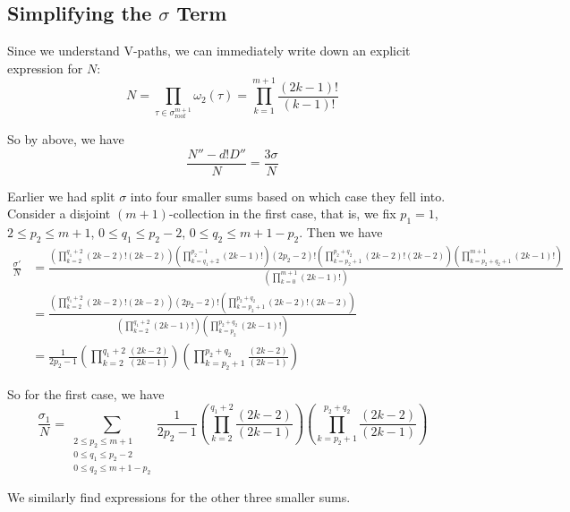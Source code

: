 \documentclass[11pt]{article}
\theoremstyle{mythm}
\begin{document}
\subsection{Simplifying the $\sigma$ Term}

Since we understand V-paths, we can immediately write down an explicit expression for $N$:
\begin{equation*}
N = \prod\limits_{\tau\in\sigma_{\text{roof}}^{m+1}}\omega_2(\tau) = \prod\limits_{k=1}^{m+1}\frac{(2k-1)!}{(k-1)!}
\end{equation*}

So by above, we have
\begin{equation*}
\frac{N''-d!D''}{N} = \frac{3\sigma}{N}
\end{equation*}

Earlier we had split $\sigma$ into four smaller sums based on which case they fell into. Consider a disjoint $(m+1)$-collection in the first case, that is, we fix $p_1 = 1$, $2\leq p_2\leq m+1$, $0\leq q_1\leq p_2 - 2$, $0\leq q_2 \leq m+1-p_2$. Then we have
\begin{align*}
\frac{\sigma'}{N} &= \frac{\left(\prod\limits_{k=2}^{q_1+2}(2k-2)!(2k-2)\right)\left(\prod\limits_{k=q_1+2}^{p_2-1}(2k-1)!\right)(2p_2-2)!\left(\prod\limits_{k=p_2+1}^{p_2+q_2}(2k-2)!(2k-2)\right)\left(\prod\limits_{k=p_2+q_2+1}^{m+1}(2k-1)!\right)}{\left(\prod\limits_{k=0}^{m+1}(2k-1)!\right)} \\
&= \frac{\left(\prod\limits_{k=2}^{q_1+2}(2k-2)!(2k-2)\right)(2p_2-2)!\left(\prod\limits_{k=p_2+1}^{p_2+q_2}(2k-2)!(2k-2)\right)}{\left(\prod\limits_{k=2}^{q_1+2}(2k-1)!\right)\left(\prod\limits_{k=p_2}^{p_2+q_2}(2k-1)!\right)} \\
&= \frac{1}{2p_2-1}\left(\prod\limits_{k=2}^{q_1+2}\frac{(2k-2)}{(2k-1)}\right)\left(\prod\limits_{k=p_2+1}^{p_2+q_2}\frac{(2k-2)}{(2k-1)}\right)
\end{align*}

So for the first case, we have
\begin{equation*}
\frac{\sigma_1}{N} = \sum\limits_{\substack{2\leq p_2\leq m+1 \\ 0\leq q_1 \leq p_2-2 \\ 0\leq q_2 \leq m+1-p_2}}\frac{1}{2p_2-1}\left(\prod\limits_{k=2}^{q_1+2}\frac{(2k-2)}{(2k-1)}\right)\left(\prod\limits_{k=p_2+1}^{p_2+q_2}\frac{(2k-2)}{(2k-1)}\right)
\end{equation*}

We similarly find expressions for the other three smaller sums.
\end{document}
